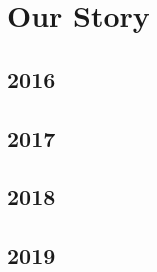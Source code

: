 

    \section{Our Story}
    \subsection{2016}
    \subsection{2017}
    \subsection{2018}
    \subsection{2019}

